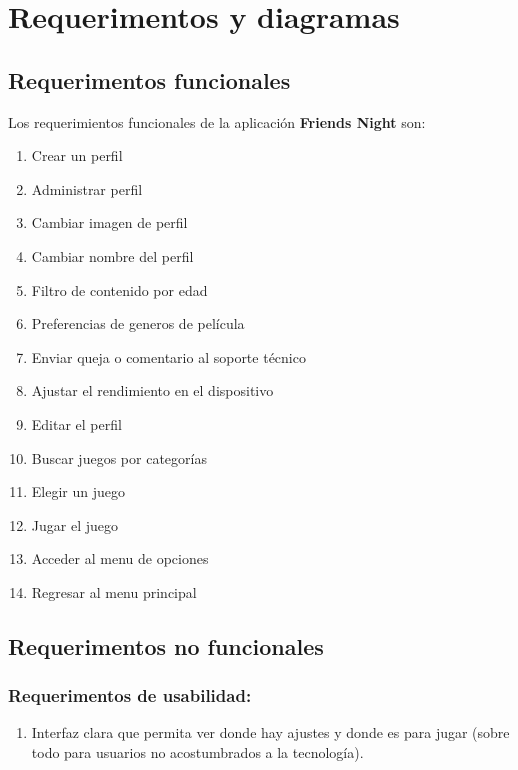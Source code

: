 \documentclass[12pt, oneside, letterpaper]{book}
\begin{document}
\part{Requerimentos y diagramas}

\chapter{Requerimentos funcionales}
\fontsize{14}{18}\selectfont
Los requerimientos funcionales de la aplicación \textbf{Friends Night} son:
\par 
\begin{enumerate}
\item Crear un perfil
\item Administrar perfil 
\item Cambiar imagen de perfil
\item Cambiar nombre del perfil 
\item Filtro de contenido por edad
\item Preferencias de generos de película 
\item Enviar queja o comentario al soporte técnico
\item Ajustar el rendimiento en el dispositivo
\item Editar el perfil
\item Buscar juegos por categorías
\item Elegir un juego
\item Jugar el juego
\item Acceder al menu de opciones
\item Regresar al menu principal 
\end{enumerate}

\chapter{Requerimentos no funcionales}
\fontsize{14}{18}\selectfont
\par 
\section{Requerimentos de usabilidad: }
\begin{enumerate}
\item Interfaz clara que permita ver donde hay ajustes y donde es para jugar (sobre todo para usuarios no acostumbrados a la tecnología).
\end{enumerate}
\end{document}
